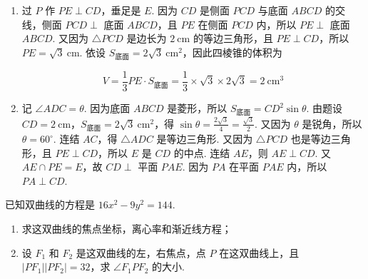 \begin{solution}
\begin{enumerate}
\item 过 \(P\) 作 \(PE \perp CD\)，垂足是 \(E\). 因为 \(CD\) 是侧面 \(PCD\) 与底面 \(ABCD\) 的交线，侧面 \(PCD \perp\) 底面 \(ABCD\)，且 \(PE\) 在侧面 \(PCD\) 内，所以 \(PE \perp\) 底面 \(ABCD\). 又因为 \(\triangle PCD\) 是边长为 \(2\mathrm{~cm}\) 的等边三角形，且 \(PE \perp CD\)，所以 \(PE=\sqrt{3}\mathrm{~cm}\). 依设 \(S_{\text{底面}}=2\sqrt{3}\mathrm{~cm}^2\)，因此四棱锥的体积为

\[
V=\frac{1}{3}PE\cdot S_{\text{底面}}=\frac{1}{3}\times\sqrt{3}\times2\sqrt{3}=2\mathrm{~cm}^3
\]

\item 记 \(\angle ADC=\theta\). 因为底面 \(ABCD\) 是菱形，所以 \(S_{\text{底面}}=CD^2\sin\theta\). 由题设 \(CD=2\mathrm{~cm}\)，\(S_{\text{底面}}=2\sqrt{3}\mathrm{~cm}^2\)，得 \(\sin\theta=\frac{2\sqrt{3}}{4}=\frac{\sqrt{3}}{2}\). 又因为 \(\theta\) 是锐角，所以 \(\theta=60^{\circ}\). 连结 \(AC\)，得 \(\triangle ADC\) 是等边三角形. 又因为 \(\triangle PCD\) 也是等边三角形，且 \(PE\perp CD\)，所以 \(E\) 是 \(CD\) 的中点. 连结 \(AE\)，则 \(AE\perp CD\). 又 \(AE\cap PE=E\)，故 \(CD\perp\) 平面 \(PAE\). 因为 \(PA\) 在平面 \(PAE\) 内，所以 \(PA\perp CD\).
\end{enumerate}
\end{solution}

\begin{problem}
已知双曲线的方程是 \(16x^2 - 9y^2 = 144\).
\begin{enumerate}
\item 求这双曲线的焦点坐标，离心率和渐近线方程；
\item 设 \(F_1\) 和 \(F_2\) 是这双曲线的左，右焦点，点 \(P\) 在这双曲线上，且 \(\left|PF_1\right|\left|PF_2\right| = 32\)，求 \(\angle F_1PF_2\) 的大小.
\end{enumerate}
\end{problem}

